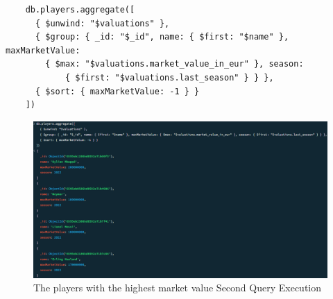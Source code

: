 \documentclass{Configuration_Files/PoliMi3i_thesis}
\begin{document}
\begin{verbatim}
    db.players.aggregate([
      { $unwind: "$valuations" },
      { $group: { _id: "$_id", name: { $first: "$name" }, maxMarketValue: 
        { $max: "$valuations.market_value_in_eur" }, season: 
            { $first: "$valuations.last_season" } } },
      { $sort: { maxMarketValue: -1 } }
    ])
\end{verbatim}
\begin{figure}[htbp]
    \centering
    \includegraphics[scale=0.75]{Images/Queries/Highest_value_players/2.png}
    \caption{The players with the highest market value Second Query Execution}
\end{figure}
\end{document}

